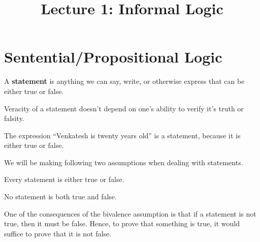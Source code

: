 \documentclass[a4paper,english,12pt]{article}
\title{Lecture 1: Informal Logic}
\author{}
\begin{document}
\maketitle

\section{Sentential/Propositional Logic}
\begin{defn}[Statement] A \textbf{statement} is anything we can say, write, or otherwise express that can be either true or false. 
\end{defn}
\begin{rem} Veracity of a statement doesn't depend on one's ability to verify it's truth or falsity.
\end{rem}
\begin{exmp}
The expression ``Venkatesh is twenty years old'' is a statement, because it is either true or false.
\end{exmp}
We will be making following two assumptions when dealing with statements.
\begin{assum}[Bivalence] Every statement is either true or false.
\end{assum}
\begin{assum} No statement is both true and false.
\end{assum}
One of the consequences of the bivalence assumption is that if a statement is not true, then it must be false. Hence, to prove that something is true, it would suffice to prove that it is not false.
\end{document}
